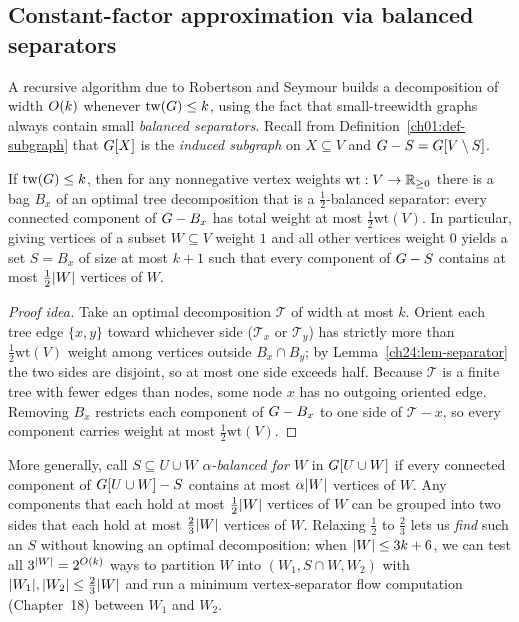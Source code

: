 \subsection{Constant-factor approximation via balanced separators}

A recursive algorithm due to Robertson and Seymour builds a decomposition of width
$O(k)$ whenever $\operatorname{tw}(G)\le k$, using the fact that small-treewidth graphs
always contain small \emph{balanced separators}. Recall from Definition~\ref{ch01:def-subgraph} that $G[X]$ is the
\emph{induced subgraph} on $X\subseteq V$ and $G-S=G[V\setminus S]$.

\begin{lemma}
\label{ch24:lem-balanced-sep}
If $\operatorname{tw}(G)\le k$, then for any nonnegative vertex weights $\mathrm{wt}:V\to\mathbb{R}_{\ge 0}$
there is a bag $B_x$ of an optimal tree decomposition that is a
$\tfrac12$-balanced separator: every connected component of $G-B_x$ has
total weight at most $\tfrac12\mathrm{wt}(V)$. In particular, giving vertices of a
subset $W\subseteq V$ weight $1$ and all other vertices weight $0$ yields a set
$S=B_x$ of size at most $k+1$ such that every component of $G-S$
contains at most $\tfrac12\lvert W\rvert$ vertices of $W$.
\end{lemma}

\begin{proof}[Proof idea]
Take an optimal decomposition $\mathcal{T}$ of width at most $k$. Orient each tree
edge $\{x,y\}$ toward whichever side ($\mathcal{T}_x$ or $\mathcal{T}_y$) has
strictly more than $\tfrac12\mathrm{wt}(V)$ weight among vertices outside
$B_x\cap B_y$; by Lemma~\ref{ch24:lem-separator} the two sides are disjoint, so at
most one side exceeds half. Because $\mathcal{T}$ is a finite tree with fewer
edges than nodes, some node $x$ has no outgoing oriented edge. Removing $B_x$
restricts each component of $G-B_x$ to one side of $\mathcal{T}-x$, so
every component carries weight at most $\tfrac12\mathrm{wt}(V)$.
\end{proof}

More generally, call $S\subseteq U\cup W$ \emph{$\alpha$-balanced for $W$} in
$G[U\cup W]$ if every connected component of $G[U\cup W]-S$ contains
at most $\alpha\lvert W\rvert$ vertices of $W$. Any components that each hold at most
$\tfrac12\lvert W\rvert$ vertices of $W$ can be grouped into two sides that each hold at
most $\tfrac23\lvert W\rvert$ vertices of $W$. Relaxing $\tfrac12$ to $\tfrac23$ lets us
\emph{find} such an $S$ without knowing an optimal decomposition: when
$\lvert W\rvert\le 3k+6$, we can test all $3^{\lvert W\rvert}=2^{O(k)}$ ways to partition $W$
into $(W_1, S\cap W, W_2)$ with $\lvert W_1\rvert,\lvert W_2\rvert\le \tfrac23\lvert W\rvert$ and run a
minimum vertex-separator flow computation (Chapter~18) between $W_1$ and $W_2$.

